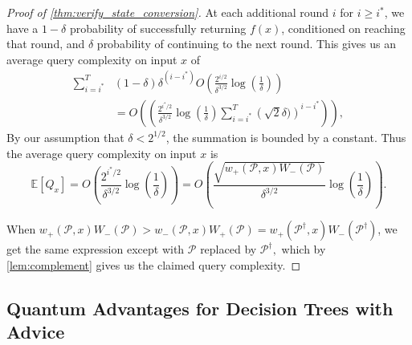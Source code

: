 \documentclass[cleveref, autoref, thm-restate,11pt]{article}
\theoremstyle{definition}
\renewcommand{\wp}[2]{{w_+({#1},{#2})}}
\newcommand{\wm}[2]{{w_-({#1},{#2})}}
\begin{document}
\begin{proof}[Proof of \cref{thm:verify_state_conversion}]
At each additional round $i$ for $i\geq i^*$, we have a $1-\delta$ probability of successfully returning $f(x)$, conditioned on reaching that round, and $\delta$ probability of continuing to the next round. This gives us an average query complexity on input $x$ of
\begin{align}
\sum_{i=i^*}^{T}&\left(1-\delta\right)\delta^{(i-i^*)}O\left(\frac{2^{i/2}}{\delta^{3/2}}\log\left(\frac{1}{\delta}\right)\right)\nonumber\\
&=O\left(\left(\frac{2^{i^*/2}}{\delta^{3/2}}\log\left(\frac{1}{\delta}\right)\sum_{i=i^*}^T\left(\sqrt{2}\delta)\right)^{i-i^*}\right)\right),
\end{align}
By our assumption that $\delta<2^{1/2}$, the summation is bounded by a constant. Thus the average query complexity on input $x$ is
\begin{equation}
\mathbb{E}[Q_x]=O\left(\frac{2^{i^*/2}}{\delta^{3/2}}\log\left(\frac{1}{\delta}\right)\right)=
O\left(\frac{\sqrt{\wp{\mathscr P}{x}W_-(\mathscr P)}}{\delta^{3/2}}\log\left(\frac{1}{\delta}\right)\right).
\end{equation}

When $\wp{\mathscr P}{x}W_-(\mathscr P)> \wm{\mathscr P}{x}W_+(\mathscr P)=\wp{\mathscr P^\dagger}{x}W_-(\mathscr P^\dagger)$, we get
the same expression except with $\mathscr P$ replaced by $\mathscr{P}^\dagger,$ which by \cref{lem:complement} gives us the claimed query complexity.
\end{proof}


\subsection{Quantum Advantages for Decision Trees with Advice}
\label{sec:tree_application}




 
\end{document}
